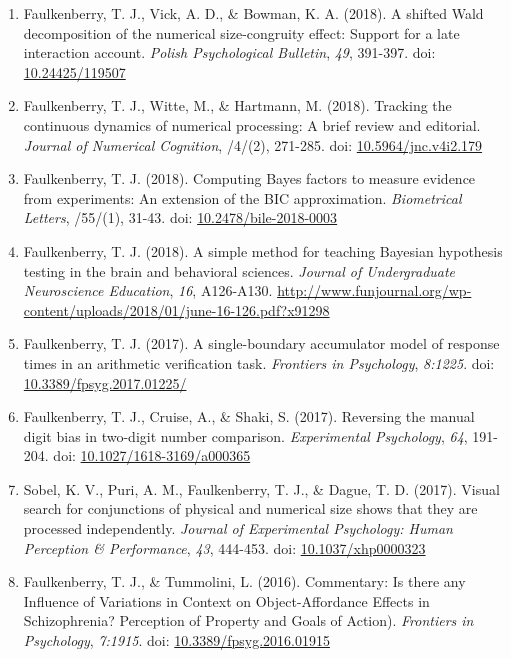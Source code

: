 \documentclass[article,10pt]{article}
\begin{document}
\begin{enumerate}
\item Faulkenberry, T. J., Vick, A. D., \& Bowman, K. A. (2018). A shifted Wald decomposition of the numerical size-congruity effect: Support for a late interaction account. \emph{Polish Psychological Bulletin}, \emph{49}, 391-397. doi: \href{http://dx.doi.org/10.24425/119507}{10.24425/119507}
\item Faulkenberry, T. J., Witte, M., \& Hartmann, M. (2018). Tracking the continuous dynamics of numerical processing: A brief review and editorial. \emph{Journal of Numerical Cognition}, /4/(2), 271-285. doi: \href{http://dx.doi.org/10.5964/jnc.v4i2.179}{10.5964/jnc.v4i2.179}
\item Faulkenberry, T. J. (2018). Computing Bayes factors to measure evidence from experiments: An extension of the BIC approximation. \emph{Biometrical Letters}, /55/(1), 31-43. doi: \href{https://doi.org/10.2478/bile-2018-0003}{10.2478/bile-2018-0003}
\item Faulkenberry, T. J. (2018). A simple method for teaching Bayesian hypothesis testing in the brain and behavioral sciences. \emph{Journal of Undergraduate Neuroscience Education}, \emph{16}, A126-A130. \url{http://www.funjournal.org/wp-content/uploads/2018/01/june-16-126.pdf?x91298}
\item Faulkenberry, T. J. (2017). A single-boundary accumulator model of response times in an arithmetic verification task. \emph{Frontiers in Psychology}, \emph{8:1225}. doi: \href{http://dx.doi.org/10.3389/fpsyg.2017.01225}{10.3389/fpsyg.2017.01225/}
\item Faulkenberry, T. J., Cruise, A., \& Shaki, S. (2017). Reversing the manual digit bias in two-digit number comparison. \emph{Experimental Psychology}, \emph{64}, 191-204.  doi: \href{http://dx.doi.org/10.1027/1618-3169/a000365}{10.1027/1618-3169/a000365}
\item Sobel, K. V., Puri, A. M., Faulkenberry, T. J., \& Dague, T. D. (2017). Visual search for conjunctions of physical and numerical size shows that they are processed independently. \emph{Journal of Experimental Psychology: Human Perception \& Performance}, \emph{43}, 444-453. doi: \href{http://dx.doi.org/10.1037/xhp0000323}{10.1037/xhp0000323}
\item Faulkenberry, T. J., \& Tummolini, L. (2016). Commentary: Is there any Influence of Variations in Context on Object-Affordance Effects in Schizophrenia? Perception of Property and Goals of Action). \emph{Frontiers in Psychology}, \emph{7:1915}. doi: \href{http://dx.doi.org/10.3389/fpsyg.2016.01915}{10.3389/fpsyg.2016.01915}

\end{enumerate}
\end{document}
